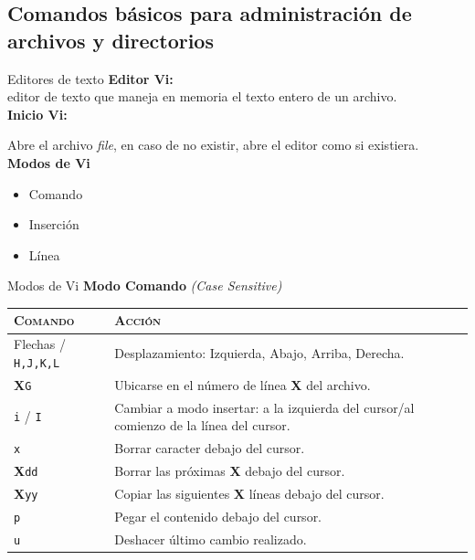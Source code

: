 \documentclass{beamer}
\begin{document}
\subsection{Comandos básicos para administración de archivos y directorios}
\begin{frame}{Editores de texto}
\textbf{Editor Vi:} \\editor de texto que maneja en memoria el texto entero de un archivo.\\[0.5cm]
\textbf{Inicio Vi:}
\begin{center}
\end{center}
Abre el archivo \textit{file}, en caso de no existir, abre el editor como si existiera.\\[0.5cm]
\textbf{Modos de Vi}
\begin{itemize}
    \item Comando
    \item Inserción
    \item Línea
\end{itemize}
\end{frame}
\begin{frame}{Modos de Vi}
\textbf{Modo Comando} \textit{\small (Case Sensitive)}\\[0.5cm]
{\scriptsize
\begin{tabular}{l|p{8cm}}
     \textsc{Comando}&\textsc{Acción}\\\hline
     Flechas / \texttt{H,J,K,L} & Desplazamiento: Izquierda, Abajo, Arriba, Derecha.\\\hline
     \textbf{X}\texttt{G} & Ubicarse en el número de línea \textbf{X} del archivo.\\\hline
     \texttt{i} / \texttt{I} & Cambiar a modo insertar: a la izquierda del cursor/al comienzo de la línea del cursor.\\\hline
     \texttt{x} &Borrar caracter debajo del cursor.\\\hline
     \textbf{X}\texttt{dd} &Borrar las próximas \textbf{X}  debajo del cursor.\\\hline
     \textbf{X}\texttt{yy} &Copiar las siguientes \textbf{X} líneas debajo del cursor. \\\hline
     \texttt{p} &Pegar el contenido debajo del cursor. \\\hline
     \texttt{u} &Deshacer último cambio realizado.
\end{tabular}

}
\end{frame}
\end{document}
